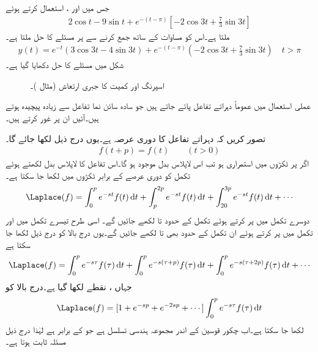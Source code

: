 جس میں  اور   ،  استعمال کرتے ہوئے
\begin{align*}
2\cos t-9\sin t+e^{-(t-\pi)}[-2\cos 3t+\frac{7}{3}\sin 3t]
\end{align*}
ملتا ہے۔اس کو مساوات   کے ساتھ جمع کرنے سے  پر مسئلے کا حل ملتا ہے۔
\begin{multline}
y(t)=e^{-t}(3\cos 3t-4\sin 3t)+e^{-(t-\pi)}(-2\cos 3t+\frac{7}{3}\sin 3t) \quad t>\pi
\end{multline} 
شکل  میں مسئلے کا حل دکھایا گیا ہے۔
\begin{figure}
\centering
{}
\caption{اسپرنگ اور کمیت کا جبری ارتعاش (مثال )۔}
\label{شکل_مثال_لاپلاس_بدل_نیم_موج}
\end{figure}

عملی استعمال میں عموماً دہراتے تفاعل پائے جاتے ہیں جو سادہ سائن نما تفاعل سے زیادہ پیچیدہ ہوتے ہیں۔آئیں ان پر غور کرتے ہیں۔

تصور کریں کہ دہراتے تفاعل  کا دوری عرصہ  ہے۔یوں درج ذیل لکھا جائے گا۔
\begin{align}
f(t+p)=f(t)\quad \quad (t>0)
\end{align}
اگر  پر  ٹکڑوں میں استمراری ہو تب اس لاپلاس بدل موجود ہو گا۔اس تفاعل کا لاپلاس بدل  لکھتے ہوئے تکمل کو دوری عرصے کے برابر ٹکڑوں میں لکھا جا سکتا ہے۔
\begin{align*}
\Laplace(f)=\int_{0}^{p}e^{-st}f(t)\dif t+\int_{p}^{2p}e^{-st}f(t)\dif t+\int_{20}^{3p}e^{-st}f(t)\dif t+\cdots
\end{align*}     
دوسرے تکمل میں  پر کرتے ہوئے تکمل کے حدود  تا  لکھے جائیں گے۔ اسی طرح تیسرے تکمل میں  اور   تکمل میں  پر کرتے ہوئے ان تکمل کے حدود بھی  تا  لکھے جائیں گے۔یوں درج بالا کو درج ذیل لکھا جا سکتا ہے
\begin{align*}
\Laplace(f)=\int_{0}^{p}e^{-s\tau}f(\tau)\dif t+\int_{0}^{p}e^{-s(\tau+p)}f(\tau)\dif t+\int_{0}^{p}e^{-s(\tau+2p)}f(\tau)\dif t+\cdots
\end{align*}   
جہاں ،  نقطے لکھا گیا ہے۔درج بالا کو
\begin{align*}
\Laplace(f)=[1+e^{-sp}+e^{-2sp}+\cdots]\int_{0}^{p}e^{-s\tau}f(\tau)\dif t
\end{align*}   
لکھا جا سکتا ہے۔اب چکور قوسین کے اندر مجموعہ ہندسی تسلسل ہے جو  کے برابر ہے  لہٰذا درج ذیل مسئلہ ثابت ہوتا ہے۔


